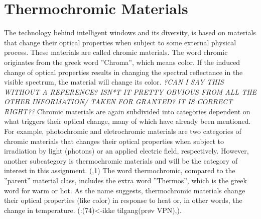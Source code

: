 \section{Thermochromic Materials}
%
The technology behind intelligent windows and its diversity, is based on
materials that change their optical properties when subject to some external physical process.
These materials are called chromic materials. 
The word chromic originates from the greek word ''Chroma'', which means color.
If the induced change of optical properties results in changing the spectral reflectance in
the visible spectrum, the material will change its color. 
\textit{?CAN I SAY THIS WITHOUT A REFERENCE? ISN*T IT PRETTY OBVIOUS FROM ALL THE OTHER INFORMATION/
TAKEN FOR GRANTED? IT IS CORRECT RIGHT??} 
Chromic materials are again subdivided into categories dependent on what triggers their optical change, 
many of which have already been mentioned.
For example, photochromic and eletrochromic materials are two categories of chromic materials 
that changes their optical properties when subject to irradiation by light (photons) or an applied 
electric field, respectively. However, another subcategory is thermochromic materials and will be the
category of interest in this assignment.
(\cite{Kiri2010},1)
The word thermochromic, compared to the ''parent'' material class, includes the extra word ''Thermos'', 
which is the greek word for warm or hot. 
As the name suggests, thermochromic materials change their optical
properties (like color) in response to heat or, in other words, the change in temperature.
(\cite{Kamalisarvestani2013}:(74)<-ikke tilgang(prøv VPN),\cite{Parkin2006}). 
